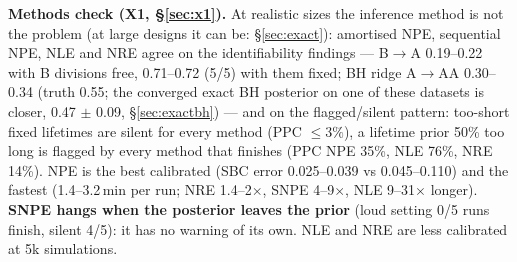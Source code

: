 \documentclass[10pt,a4paper]{article}
\newcommand{\sref}[1]{\S\ref{#1}}
\begin{document}
\textbf{Methods check (X1, \S\ref{sec:x1}).} At realistic sizes the inference method is not the problem (at large designs it can be: \sref{sec:exact}): amortised NPE, sequential NPE, NLE and NRE agree on the identifiability findings --- B$\to$A 0.19--0.22 with B divisions free, 0.71--0.72 (5/5) with them fixed; BH ridge A$\to$AA 0.30--0.34 (truth 0.55; the converged exact BH posterior on one of these datasets is closer, 0.47 $\pm$ 0.09, \sref{sec:exactbh}) --- and on the flagged/silent pattern: too-short fixed lifetimes are silent for every method (PPC $\le 3\%$), a lifetime prior 50\% too long is flagged by every method that finishes (PPC NPE 35\%, NLE 76\%, NRE 14\%). NPE is the best calibrated (SBC error 0.025--0.039 vs 0.045--0.110) and the fastest (1.4--3.2\,min per run; NRE 1.4--2$\times$, SNPE 4--9$\times$, NLE 9--31$\times$ longer). \textbf{SNPE hangs when the posterior leaves the prior} (loud setting 0/5 runs finish, silent 4/5): it has no warning of its own. NLE and NRE are less calibrated at 5k simulations.
\end{document}
